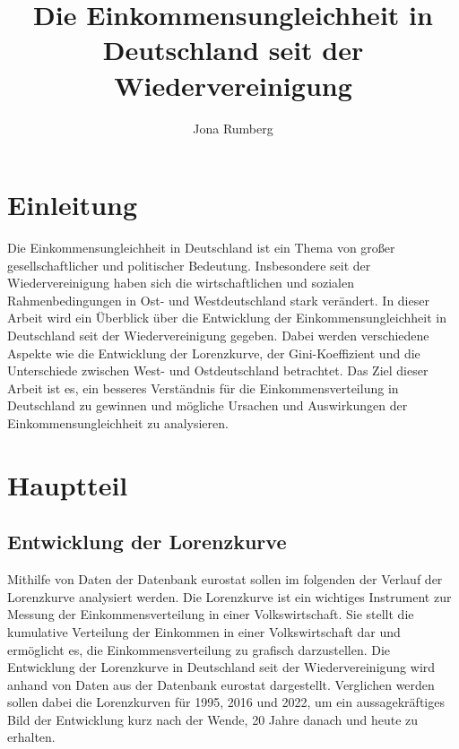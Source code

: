 \documentclass[a4paper,12pt]{article}
\begin{document}
\begin{titlepage}

\title{Die Einkommensungleichheit in Deutschland seit der Wiedervereinigung}    

\author{Jona Rumberg}


\end{titlepage}

\maketitle
\thispagestyle{empty}
\newpage
{}

\section*{Einleitung}
Die Einkommensungleichheit in Deutschland ist ein Thema von großer gesellschaftlicher und politischer Bedeutung. Insbesondere seit der Wiedervereinigung haben sich die wirtschaftlichen und sozialen Rahmenbedingungen in Ost- und Westdeutschland stark verändert. In dieser Arbeit wird ein Überblick über die Entwicklung der Einkommensungleichheit in Deutschland seit der Wiedervereinigung gegeben. Dabei werden verschiedene Aspekte wie die Entwicklung der Lorenzkurve, der Gini-Koeffizient und die Unterschiede zwischen West- und Ostdeutschland betrachtet. Das Ziel dieser Arbeit ist es, ein besseres Verständnis für die Einkommensverteilung in Deutschland zu gewinnen und mögliche Ursachen und Auswirkungen der Einkommensungleichheit zu analysieren.


\section*{Hauptteil}
\subsection*{Entwicklung der Lorenzkurve}
Mithilfe von Daten der Datenbank eurostat sollen im folgenden der Verlauf der Lorenzkurve analysiert werden. 
Die Lorenzkurve ist ein wichtiges Instrument zur Messung der Einkommensverteilung in einer Volkswirtschaft.
Sie stellt die kumulative Verteilung der Einkommen in einer Volkswirtschaft dar und ermöglicht es, die Einkommensverteilung zu grafisch darzustellen.
Die Entwicklung der Lorenzkurve in Deutschland seit der Wiedervereinigung wird anhand von Daten aus der Datenbank eurostat dargestellt.
Verglichen werden sollen dabei die Lorenzkurven für 1995, 2016 und 2022, um ein aussagekräftiges Bild der Entwicklung kurz nach der Wende, 20 Jahre danach und heute zu erhalten.
\end{document}
